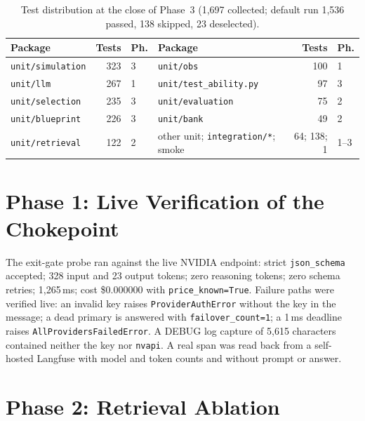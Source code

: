 \documentclass{tietreport}
\begin{document}
\begin{table}[htbp]
\centering\small
\begin{tabular}{lrl@{\qquad}lrl}
  \toprule
  \textbf{Package} & \textbf{Tests} & \textbf{Ph.} & \textbf{Package} & \textbf{Tests} & \textbf{Ph.} \\
  \midrule
  \texttt{unit/simulation} & 323 & 3 & \texttt{unit/obs} & 100 & 1 \\
  \texttt{unit/llm} & 267 & 1 & \texttt{unit/test\_ability.py} & 97 & 3 \\
  \texttt{unit/selection} & 235 & 3 & \texttt{unit/evaluation} & 75 & 2 \\
  \texttt{unit/blueprint} & 226 & 3 & \texttt{unit/bank} & 49 & 2 \\
  \texttt{unit/retrieval} & 122 & 2 & other unit; \texttt{integration/*}; smoke & 64; 138; 1 & 1--3 \\
  \bottomrule
\end{tabular}
\caption{Test distribution at the close of Phase~3 (1,697 collected; default run 1,536 passed, 138 skipped, 23 deselected).}
\label{tab:tests}
\end{table}

\section{Phase 1: Live Verification of the Chokepoint}
\label{sec:live-verification}

The exit-gate probe ran against the live NVIDIA endpoint: strict \texttt{json\_schema} accepted;
328 input and 23 output tokens; zero reasoning tokens; zero schema retries; 1,265\,ms; cost
\$0.000000 with \texttt{price\_known=True}. Failure paths were verified live: an invalid key raises
\texttt{ProviderAuthError} without the key in the message; a dead primary is answered with
\texttt{failover\_count=1}; a 1\,ms deadline raises \texttt{AllProvidersFailedError}. A DEBUG log capture
of 5,615 characters contained neither the key nor \texttt{nvapi}. A real span was read back from a
self-hosted Langfuse with model and token counts and without prompt or answer.

\section{Phase 2: Retrieval Ablation}
\label{sec:retrieval-results}
\end{document}
